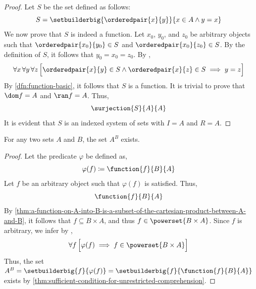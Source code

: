 \begin{proof}
    Let \( S \) be the set defined as follows:
    \begin{equation*}
        S = \setbuilderbig{\orderedpair{x}{y}}{x \in A \land y = x}
    \end{equation*}
    We now prove that \( S \) is indeed a function. Let \( x_{0} \), \( y_{0} \), and \( z_{0} \)
    be arbitrary objects such that \( \orderedpair{x_{0}}{y_{0}} \in S \) and \( \orderedpair{x_{0}}{z_{0}} \in S \).
    By the definition of \( S \), it follows that \( y_{0} = x_{0} = z_{0} \). By ,
    \begin{equation*}
        \forall x \, \forall y \, \forall z \, \Big[ \orderedpair{x}{y} \in S \land \orderedpair{x}{z} \in S \implies y = z \Big]
    \end{equation*}
    By \cref{dfn:function-basic}, it follows that \( S \) is a function. It is trivial to prove that \( \dom f = A \) and \( \ran f = A \).
    Thus,
    \begin{equation*}
        \surjection{S}{A}{A}
    \end{equation*}
    It is evident that \( S \) is an indexed system of sets with \( I = A \) and \( R = A \).
\end{proof}

\begin{thm}
    \label{thm:existence-of-set-exponentiation}
    For any two sets \( A \) and \( B \), the set \( A^{B} \) exists.
\end{thm}

\begin{proof}
    Let the predicate \( \varphi \) be defined as,
    \begin{equation*}
        \varphi(f) \coloneq \function{f}{B}{A}
    \end{equation*}
    Let \( f \) be an arbitrary object such that \( \varphi(f) \) is satisfied. Thus,
    \begin{equation*}
        \function{f}{B}{A}
    \end{equation*}
    By \cref{thm:a-function-on-A-into-B-is-a-subset-of-the-cartesian-product-between-A-and-B},
    it follows that \( f \subseteq B \times A \), and thus \( f \in \powerset{B \times A} \).
    Since \( f \) is arbitrary, we infer by ,
    \begin{equation*}
        \forall f \, \Big[ \varphi(f) \implies f \in \powerset{B \times A} \Big]
    \end{equation*}
    Thus, the set \( A^{B} = \setbuilderbig{f}{\varphi(f)} = \setbuilderbig{f}{\function{f}{B}{A}} \) exists
    by \cref{thm:sufficient-condition-for-unrestricted-comprehension}.
\end{proof}

